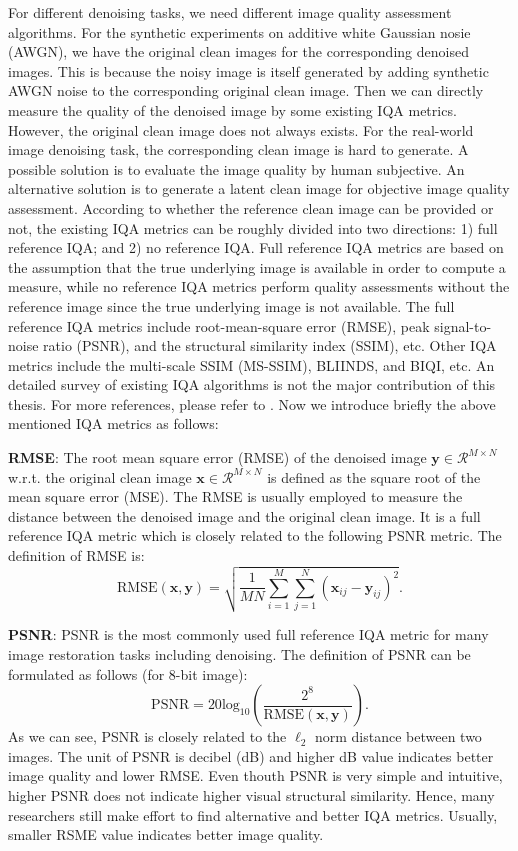 For different denoising tasks, we need different image quality assessment algorithms. For the synthetic experiments on additive white Gaussian nosie (AWGN), we have the original clean images for the corresponding denoised images. This is because the noisy image is itself generated by adding synthetic AWGN noise to the corresponding original clean image. Then we can directly measure the quality of the denoised image by some existing IQA metrics. However, the original clean image does not always exists. For the real-world image denoising task, the corresponding clean image is hard to generate. A possible solution is to evaluate the image quality by human subjective. An alternative solution is to generate a latent clean image for objective image quality assessment. According to whether the reference clean image can be provided or not, the existing IQA metrics can be roughly divided into two directions: 1) full reference IQA; and 2) no reference IQA. Full reference IQA metrics are based on the assumption that the true underlying image is available in order to compute a measure, while no reference IQA metrics perform quality assessments without the reference image since the true underlying image is not available. The full reference IQA metrics include root-mean-square error (RMSE), peak signal-to-noise ratio (PSNR), and the structural similarity index (SSIM), etc. Other IQA metrics include the multi-scale SSIM (MS-SSIM), BLIINDS, and BIQI, etc. An detailed survey of existing IQA algorithms is not the major contribution of this thesis. For more references, please refer to \cite{ssim}. Now we introduce briefly the above mentioned IQA metrics as follows:

\textbf{RMSE}: The root mean square error (RMSE) of the denoised image $\bm{y}\in\mathcal{R}^{M\times N}$ w.r.t. the original clean image $\bm{x}\in\mathcal{R}^{M\times N}$ is defined as the square root of the mean square error (MSE). The RMSE is usually employed to measure the distance between the denoised image and the original clean image. It is a full reference IQA metric which is closely related to the following PSNR metric. The definition of RMSE is:
\begin{equation}
\label{e13}
\text{RMSE}(\bm{x},\bm{y})
=
\sqrt{\frac{1}{MN}\sum_{i=1}^{M}\sum_{j=1}^{N}(\bm{x}_{ij}-\bm{y}_{ij})^{2}}.
\end{equation}



\textbf{PSNR}: PSNR is the most commonly used full reference IQA metric for many image restoration tasks including denoising. The definition of PSNR can be formulated as follows (for 8-bit image):
\begin{equation}
\label{e14}
\text{PSNR}
=
20\text{log}_{10}
(\frac{2^{8}}{\text{RMSE}(\bm{x},\bm{y})}).
\end{equation}
As we can see, PSNR is closely related to the $\ell_{2}$ norm distance between two images. The unit of PSNR is decibel (dB) and higher dB value indicates better image quality and lower RMSE. Even thouth PSNR is very simple and intuitive, higher PSNR does not indicate higher visual structural similarity. Hence, many researchers still make effort to find alternative and better IQA metrics. Usually, smaller RSME value indicates better image quality. 

